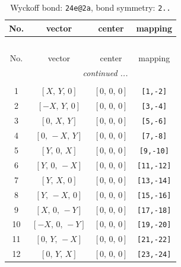 \documentclass[fleqn,8pt]{jsarticle}
\begin{document}
\begin{longtable}{cccc}
\caption{Wyckoff bond: {\tt 24e@2a}, bond symmetry: {\tt 2..}}
 \\
 \hline \hline
No. & vector & center & mapping \\ \hline \endfirsthead

\multicolumn{3}{l}{\tablename\ \thetable{}} \\
 \hline \hline
No. & vector & center & mapping \\ \hline \endhead

 \hline \hline
\multicolumn{3}{r}{\footnotesize\it continued ...} \\ \endfoot

 \hline \hline
\multicolumn{3}{r}{} \\ \endlastfoot

1 & $\left[ X,\, Y,\, 0 \right]$ & $\left[ 0,\, 0,\, 0 \right]$ & {\tt [1,-2]} \\ \hline
2 & $\left[ - X,\, Y,\, 0 \right]$ & $\left[ 0,\, 0,\, 0 \right]$ & {\tt [3,-4]} \\ \hline
3 & $\left[ 0,\, X,\, Y \right]$ & $\left[ 0,\, 0,\, 0 \right]$ & {\tt [5,-6]} \\ \hline
4 & $\left[ 0,\, - X,\, Y \right]$ & $\left[ 0,\, 0,\, 0 \right]$ & {\tt [7,-8]} \\ \hline
5 & $\left[ Y,\, 0,\, X \right]$ & $\left[ 0,\, 0,\, 0 \right]$ & {\tt [9,-10]} \\ \hline
6 & $\left[ Y,\, 0,\, - X \right]$ & $\left[ 0,\, 0,\, 0 \right]$ & {\tt [11,-12]} \\ \hline
7 & $\left[ Y,\, X,\, 0 \right]$ & $\left[ 0,\, 0,\, 0 \right]$ & {\tt [13,-14]} \\ \hline
8 & $\left[ Y,\, - X,\, 0 \right]$ & $\left[ 0,\, 0,\, 0 \right]$ & {\tt [15,-16]} \\ \hline
9 & $\left[ X,\, 0,\, - Y \right]$ & $\left[ 0,\, 0,\, 0 \right]$ & {\tt [17,-18]} \\ \hline
10 & $\left[ - X,\, 0,\, - Y \right]$ & $\left[ 0,\, 0,\, 0 \right]$ & {\tt [19,-20]} \\ \hline
11 & $\left[ 0,\, Y,\, - X \right]$ & $\left[ 0,\, 0,\, 0 \right]$ & {\tt [21,-22]} \\ \hline
12 & $\left[ 0,\, Y,\, X \right]$ & $\left[ 0,\, 0,\, 0 \right]$ & {\tt [23,-24]} \\
\end{longtable}
\renewcommand{\arraystretch}{1.2}
\end{document}
